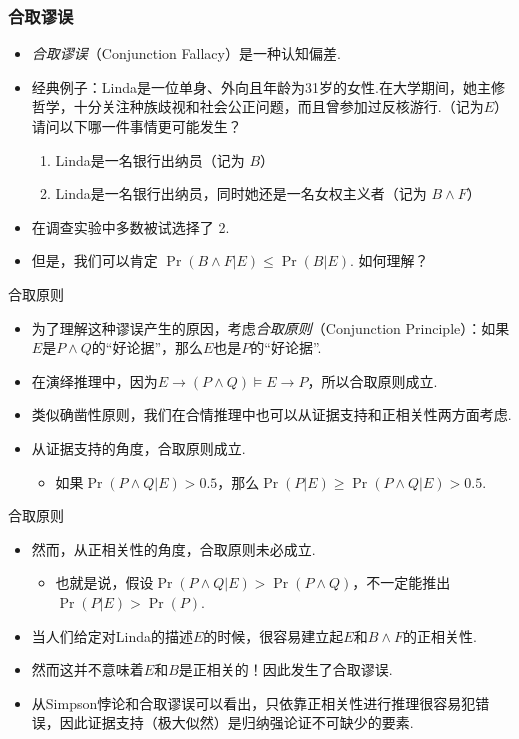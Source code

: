 \begin{frame}
    \frametitle{合取谬误}
    \begin{itemize}
        \item  \emph{合取谬误}（Conjunction Fallacy）是一种认知偏差.
    \item 经典例子：Linda是一位单身、外向且年龄为31岁的女性.在大学期间，她主修哲学，十分关注种族歧视和社会公正问题，而且曾参加过反核游行.（记为$E$）请问以下哪一件事情更可能发生？
    \begin{enumerate}
        \item Linda是一名银行出纳员（记为 $B$）
        \item Linda是一名银行出纳员，同时她还是一名女权主义者（记为 $B\wedge F$）
    \end{enumerate}
    \item 在调查实验中多数被试选择了 2.
    \item 但是，我们可以肯定 $\Pr(B \land F|E) \le \Pr(B|E)$. 如何理解？
    \end{itemize}
\end{frame}

\begin{frame}{合取原则}
\begin{itemize}
    \item 为了理解这种谬误产生的原因，考虑\emph{合取原则}（Conjunction Principle）：如果$E$是$P\wedge Q$的``好论据''，那么$E$也是$P$的``好论据''.
    \item 在演绎推理中，因为$E\to(P\wedge Q)\models E\to P$，所以合取原则成立.
    \item 类似确凿性原则，我们在合情推理中也可以从证据支持和正相关性两方面考虑.
    \item 从证据支持的角度，合取原则成立.
    \begin{itemize}
        \item 如果$\Pr(P\wedge Q|E)>0.5$，那么$\Pr(P|E)\geq \Pr(P\wedge Q|E)>0.5$.
    \end{itemize}
\end{itemize}
\end{frame}


\begin{frame}{合取原则}
\begin{itemize}
    \item 然而，从正相关性的角度，合取原则未必成立.
    \begin{itemize}
        \item 也就是说，假设$\Pr(P\wedge Q|E)>\Pr(P\wedge Q)$，不一定能推出$\Pr(P|E)>\Pr(P)$.
    \end{itemize}
    \item 当人们给定对Linda的描述$E$的时候，很容易建立起$E$和$B\wedge F$的正相关性.
    \item 然而这并不意味着$E$和$B$是正相关的！因此发生了合取谬误.
    \item 从Simpson悖论和合取谬误可以看出，只依靠正相关性进行推理很容易犯错误，因此证据支持（极大似然）是归纳强论证不可缺少的要素.
\end{itemize}
\end{frame}
